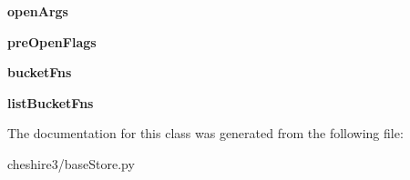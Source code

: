 \begin{DoxyCompactItemize}
\item 
\hypertarget{classcheshire3_1_1base_store_1_1_switching_bdb_connection_a0c4752e877370ece6bf47b7d52009609}{{\bfseries open\-Args}}\label{classcheshire3_1_1base_store_1_1_switching_bdb_connection_a0c4752e877370ece6bf47b7d52009609}

\item 
\hypertarget{classcheshire3_1_1base_store_1_1_switching_bdb_connection_a0fc96a830449837abd4fbe31ea090bb4}{{\bfseries pre\-Open\-Flags}}\label{classcheshire3_1_1base_store_1_1_switching_bdb_connection_a0fc96a830449837abd4fbe31ea090bb4}

\item 
\hypertarget{classcheshire3_1_1base_store_1_1_switching_bdb_connection_a2ac53691a41cfe8ae9b36b05dcede270}{{\bfseries bucket\-Fns}}\label{classcheshire3_1_1base_store_1_1_switching_bdb_connection_a2ac53691a41cfe8ae9b36b05dcede270}

\item 
\hypertarget{classcheshire3_1_1base_store_1_1_switching_bdb_connection_aac80a6b4e04b41dfb1f7141d2cb59d52}{{\bfseries list\-Bucket\-Fns}}\label{classcheshire3_1_1base_store_1_1_switching_bdb_connection_aac80a6b4e04b41dfb1f7141d2cb59d52}

\end{DoxyCompactItemize}


The documentation for this class was generated from the following file\-:\begin{DoxyCompactItemize}
\item 
cheshire3/base\-Store.\-py\end{DoxyCompactItemize}
